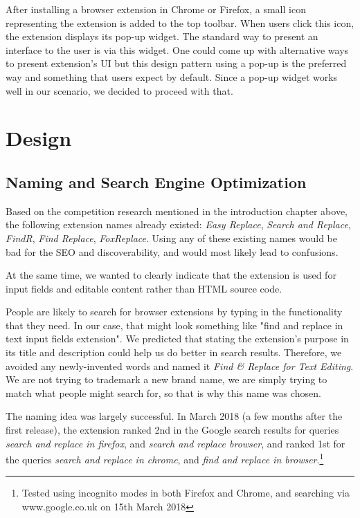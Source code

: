 \documentclass[bsc,frontabs,twoside,singlespacing,parskip,deptreport]{infthesis}
\begin{document}
After installing a browser extension in Chrome or Firefox, a small icon representing the extension is added to the top toolbar. When users click this icon, the extension displays its pop-up widget. The standard way to present an interface to the user is via this widget. One could come up with alternative ways to present extension's UI but this design pattern using a pop-up is the preferred way and something that users expect by default. Since a pop-up widget works well in our scenario, we decided to proceed with that.

\chapter{Design}

\section{Naming and Search Engine Optimization}
Based on the competition research mentioned in the introduction chapter above, the following extension names already existed: \textit{Easy Replace}, \textit{Search and Replace}, \textit{FindR}, \textit{Find Replace}, \textit{FoxReplace}. Using any of these existing names would be bad for the SEO and discoverability, and would most likely lead to confusions.

At the same time, we wanted to clearly indicate that the extension is used for input fields and editable content rather than HTML source code.

People are likely to search for browser extensions by typing in the functionality that they need. In our case, that might look something like "find and replace in text input fields extension". We predicted that stating the extension's purpose in its title and description could help us do better in search results. Therefore, we avoided any newly-invented words and named it \textit{Find \& Replace for Text Editing}. We are not trying to trademark a new brand name, we are simply trying to match what people might search for, so that is why this name was chosen.

The naming idea was largely successful. In March 2018 (a few months after the first release), the extension ranked 2nd in the Google search results for queries \textit{search and replace in firefox}, and \textit{search and replace browser}, and ranked 1st for the queries \textit{search and replace in chrome}, and \textit{find and replace in browser}.\footnote{Tested using incognito modes in both Firefox and Chrome, and searching via www.google.co.uk on 15th March 2018}
\end{document}
